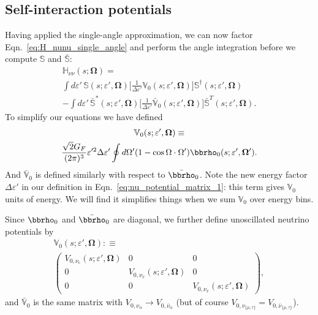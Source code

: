 \documentclass[aps,prd,twocolumn,superscriptaddress,groupedaddress]{revtex4}
\begin{document}
\subsection*{Self-interaction potentials}
Having applied the single-angle approximation, we can now factor
Eqn.~\ref{eq:H_nunu_single_angle} and perform the angle integration
before we compute $\mathbb{S}$ and $\bar{\mathbb{S}}$:
\begin{multline}
  \label{eq:H_nunu_factored}
  \mathbb{H}_{\nu\nu}(s;\bm{\Omega}) = \\
  \int d\varepsilon' \,
  \mathbb{S}(s;\varepsilon',\bm{\Omega})
  \bigg[
    \frac{1}{\Delta\varepsilon'}\mathbb{V}_0(s;\varepsilon',\bm{\Omega})
    \bigg]
  \mathbb{S}^\dagger(s;\varepsilon',\bm{\Omega}) \\
  -\int d\varepsilon' \,
  \bar{\mathbb{S}}^*(s;\varepsilon',\bm{\Omega})
  \bigg[
    \frac{1}{\Delta\varepsilon'} \bar{\mathbb{V}}_0(s;\varepsilon',\bm{\Omega})
    \bigg]
  \bar{\mathbb{S}}^T(s;\varepsilon',\bm{\Omega}).
\end{multline}
To simplify our equations we have defined
\begin{multline}
  \label{eq:nu_potential_matrix_1}
  \mathbb{V}_0(s;\varepsilon',\bm{\Omega}) \equiv \\
  \frac{\sqrt{2} G_F}{(2\pi)^3}\varepsilon'^2\Delta\varepsilon'
    \oint d\Omega' 
    (1-\cos\Omega\cdot\Omega')
    \bbrho_0(s;\varepsilon',\bm{\Omega}').
\end{multline}
And $\bar{\mathbb{V}}_0$ is defined similarly with respect to $\bar{\bbrho}_0$.
Note the new energy factor $\Delta\varepsilon'$ in our definition
in Eqn.~\ref{eq:nu_potential_matrix_1}:
this term gives $\mathbb{V}_0$ units of energy.
We will find it simplifies things when we sum $\mathbb{V}_0$ over energy bins.

Since $\bbrho_0$ and $\bar{\bbrho}_0$ are diagonal, we further
define unoscillated neutrino potentials by
\begin{multline}
  \label{eq:nu_potential_matrix_2}
  \mathbb{V}_0(s;\varepsilon',\bm{\Omega}) :\equiv \\
  \left(
  \begin{matrix}
    V_{0,\nu_e}(s;\varepsilon',\bm{\Omega}) & 0 & 0 \\
    0 & V_{0,\nu_x}(s;\varepsilon',\bm{\Omega}) & 0 \\
    0 & 0 & V_{0,\nu_x}(s;\varepsilon',\bm{\Omega})
  \end{matrix}
  \right),
\end{multline}
and $\bar{\mathbb{V}}_0$ is the same matrix with
$V_{0,\nu_\alpha} \rightarrow V_{0,\bar{\nu}_\alpha}$
(but of course $V_{0,\nu_{\{\mu,\tau\}}}=V_{0,\bar{\nu}_{\{\mu,\tau\}}}$).
\end{document}
